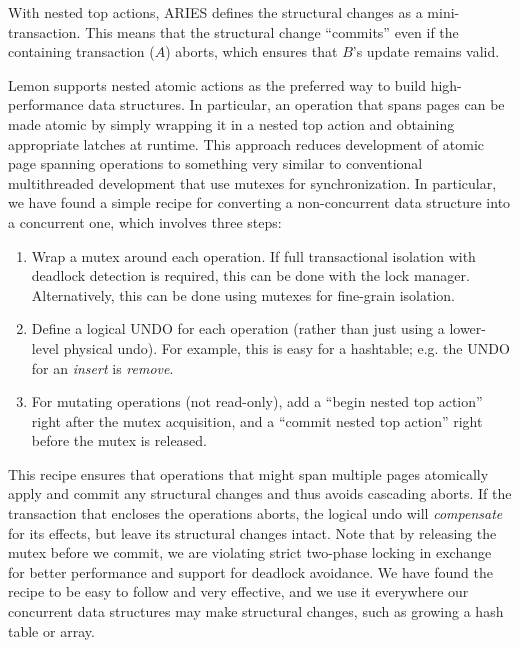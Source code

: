 \documentclass[letterpaper,twocolumn,english]{article}
\newcommand{\yad}{Lemon\xspace}
\begin{document}
With nested top actions, ARIES defines the structural changes as a
mini-transaction. This means that the structural change
``commits'' even if the containing transaction ($A$) aborts, which
ensures that $B$'s update remains valid.

\yad supports nested atomic actions as the preferred way to build
high-performance data structures. In particular, an operation that
spans pages can be made atomic by simply wrapping it in a nested top
action and obtaining appropriate latches at runtime.  This approach
reduces development of atomic page spanning operations to something
very similar to conventional multithreaded development that use mutexes
for synchronization.
In particular, we have found a simple recipe for converting a
non-concurrent data structure into a concurrent one, which involves
three steps:
\begin{enumerate}
\item Wrap a mutex around each operation.  If full transactional isolation 
  with deadlock detection is required, this can be done with the lock
  manager.  Alternatively, this can be done using mutexes for fine-grain isolation.
\item Define a logical UNDO for each operation (rather than just using
  a lower-level physical undo).  For example, this is easy for a
  hashtable; e.g. the UNDO for an {\em insert} is {\em remove}.
\item For mutating operations (not read-only), add a ``begin nested
  top action'' right after the mutex acquisition, and a ``commit
  nested top action'' right before the mutex is released.
\end{enumerate}
This recipe ensures that operations that might span multiple pages
atomically apply and commit any structural changes and thus avoids 
cascading aborts.  If the transaction that encloses the operations
aborts, the logical undo will {\em compensate} for
its effects, but leave its structural changes intact. Note that by releasing the mutex before we commit, we are
violating strict two-phase locking in exchange for better performance 
and support for deadlock avoidance.
We have found the recipe to be easy to follow and very effective, and
we use it everywhere our concurrent data structures may make structural 
changes, such as growing a hash table or array.

\end{document}
